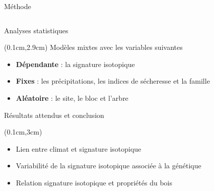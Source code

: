 \documentclass{beamer}
\begin{document}
\begin{frame}{Méthode}
\begin{columns}
	\end{columns}
		
	
\end{frame}

\begin{frame}{Analyses statistiques}
	
	\begin{textblock*}{12cm}(0.1cm,2.9cm)
		Modèles mixtes avec les variables suivantes\\
		
		\begin{itemize} %
			\item \textbf{Dépendante} : la signature isotopique \\
			\vspace{0.5cm}
			\item \textbf{Fixes} : les précipitations, les indices de sécheresse et la famille\\
			\vspace{0.5cm}
			\item \textbf{Aléatoire} : le site, le bloc et l'arbre\\			
		\end{itemize}
	\end{textblock*}
	
\end{frame}
\begin{frame}{Résultats attendus et conclusion}
	
	\begin{textblock*}{11cm}(0.1cm,3cm)
		\begin{itemize} %
			\item Lien entre climat et signature isotopique \\
			\vspace{0.7cm}
			\item Variabilité de la signature isotopique associée à la génétique\\
			\vspace{0.7cm}
			\item Relation signature isotopique et propriétés du bois\\
		\end{itemize}
	\end{textblock*}
	
\end{frame}
\end{document}
